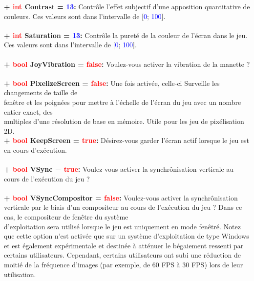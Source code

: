 \documentclass[a4paper, 11pt]{article}
\begin{document}
	\textbf{+ \textcolor{red}{int} Contrast = \textcolor{blue}{13}:} Contrôle l'effet subjectif d'une 
	apposition quantitative de couleurs. Ces valeurs sont dans l'intervalle de [\textcolor{blue}{0};
	\textcolor{blue}{100}].\\\\
	\textbf{+ \textcolor{red}{int} Saturation = \textcolor{blue}{13}:} Contrôle la pureté de la couleur de 
	l'écran dans le jeu. Ces valeurs sont dans l'intervalle de [\textcolor{blue}{0}; \textcolor{blue}{100}].
	\\\\
	\textbf{+ \textcolor{red}{bool} JoyVibration = \textcolor{red}{false}:} Voulez-vous activer la vibration 
	de la manette ?\\\\
	\textbf{+ \textcolor{red}{bool} PixelizeScreen = \textcolor{red}{false}:} Une fois activée, celle-ci 
	Surveille les changements de taille de \\fenêtre et les poignées pour mettre à l'échelle de l'écran du 
	jeu avec un nombre entier exact, des \\multiples d'une résolution de base en mémoire. Utile pour les jeu 
	de pixélisation 2D.\\
	\textbf{+ \textcolor{red}{bool} KeepScreen = \textcolor{red}{true}:} Désirez-vous garder 
	l'écran actif lorsque le jeu est en cours d'exécution.\\\\
	\textbf{+ \textcolor{red}{bool} VSync = \textcolor{red}{true}:} Voulez-vous activer la synchrônisation
	verticale au cours de l'exécution du jeu ?\\\\
	\textbf{+ \textcolor{red}{bool} VSyncCompositor = \textcolor{red}{false}:} Voulez-vous activer la
	synchrônisation verticale par le biais d'un compositeur au cours de l'exécution du jeu ? Dans ce cas,
	le compositeur de fenêtre du système \\d'exploitation sera utilisé lorsque le jeu est uniquement en mode 
	fenêtré. Notez que cette option n'est activée que sur un système d'exploitation de type Windows et est 
	également expérimentale et destinée à atténuer le bégaiement ressenti par certains utilisateurs. 
	Cependant, certains utilisateurs ont subi une réduction de moitié de la fréquence d'images (par exemple, 
	de 60 FPS à 30 FPS) lors de leur utilisation.\\\\
\end{document}
